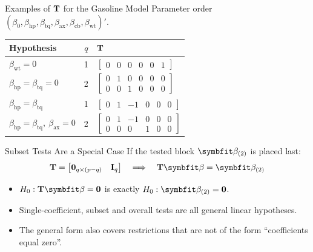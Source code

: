 \begin{frame}{Examples of $\mathbf{T}$ for the Gasoline Model}
    Parameter order $(\beta_0,\beta_{\mathrm{hp}},\beta_{\mathrm{tq}},\beta_{\mathrm{ax}},\beta_{\mathrm{cb}},\beta_{\mathrm{wt}})'$.
    \svspace{0.5em}
    \begin{center}
        \small
        \begin{tabular}{lcl}
            \toprule
            Hypothesis & $q$ & $\mathbf{T}$ \\
            \midrule
            $\beta_{\mathrm{wt}}=0$ & 1 & $\begin{bmatrix}0&0&0&0&0&1\end{bmatrix}$ \\[1.2ex]
            $\beta_{\mathrm{hp}}=\beta_{\mathrm{tq}}=0$ & 2 & $\begin{bmatrix}0&1&0&0&0&0\\0&0&1&0&0&0\end{bmatrix}$ \\[2.4ex]
            $\beta_{\mathrm{hp}}=\beta_{\mathrm{tq}}$ & 1 & $\begin{bmatrix}0&1&-1&0&0&0\end{bmatrix}$ \\[1.2ex]
            $\beta_{\mathrm{hp}}=\beta_{\mathrm{tq}},\ \beta_{\mathrm{ax}}=0$ & 2 & $\begin{bmatrix}0&1&-1&0&0&0\\0&0&0&1&0&0\end{bmatrix}$ \\
            \bottomrule
        \end{tabular}
    \end{center}
\end{frame}


\begin{frame}{Subset Tests Are a Special Case}
    If the tested block $\bbeta_{(2)}$ is placed last:
    \[
    \bT=\begin{bmatrix}\bzero_{q\times(p-q)} & \bI_q\end{bmatrix}
    \quad\Longrightarrow\quad
    \bT\bbeta=\bbeta_{(2)}
    \]
    \begin{itemize}
        \item $H_0:\bT\bbeta=\bzero$ is exactly $H_0:\bbeta_{(2)}=\bzero$.
        \item Single-coefficient, subset and overall tests are all general linear hypotheses.
        \item The general form also covers restrictions that are not of the form ``coefficients equal zero''.
    \end{itemize}
\end{frame}


